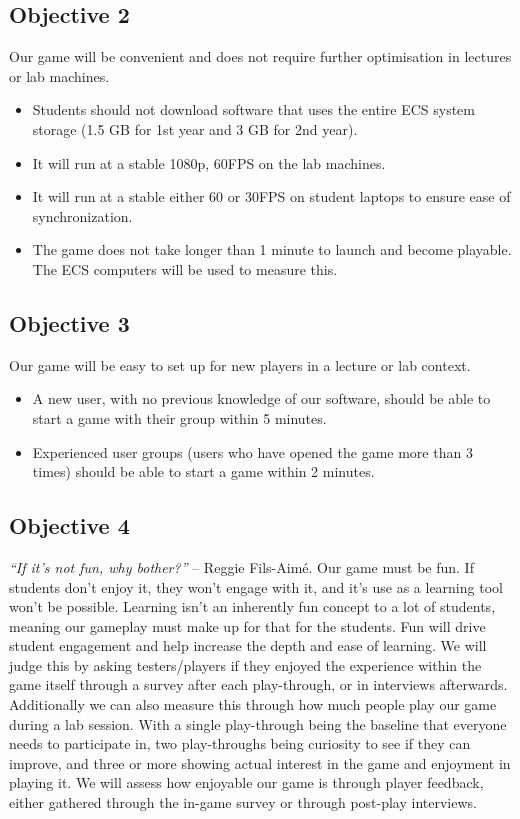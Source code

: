 \documentclass{article}
\begin{document}
\subsection*{Objective 2}
Our game will be convenient and does not require further optimisation in lectures or lab machines.
\begin{itemize}
    \item Students should not download software that uses the entire ECS system storage (1.5 GB for 1st year and 3 GB for 2nd year).
    \item It will run at a stable 1080p, 60FPS on the lab machines.
    \item It will run at a stable either 60 or 30FPS on student laptops to ensure ease of synchronization.
    \item The game does not take longer than 1 minute to launch and become playable. The ECS computers will be used to measure this.
\end{itemize}


\subsection*{Objective 3}
Our game will be easy to set up for new players in a lecture or lab context.
\begin{itemize}
    \item A new user, with no previous knowledge of our software, should be able to start a game with their group within 5 minutes.
    \item Experienced user groups (users who have opened the game more than 3 times) should be able to start a game within 2 minutes.
\end{itemize}

\subsection*{Objective 4}
\textit{“If it’s not fun, why bother?”} – Reggie Fils-Aimé.
\newline
Our game must be fun. If students don’t enjoy it, they won’t engage with it, and it's use as a learning tool won't be possible. Learning isn't an inherently fun concept to a lot of students, meaning our gameplay must make up for that for the students. Fun will drive student engagement and help increase the depth and ease of learning. 
\newline\newline
We will judge this by asking testers/players if they enjoyed the experience within the game itself through a survey after each play-through, or in interviews afterwards. Additionally we can also measure this through how much people play our game during a lab session. With a single play-through being the baseline that everyone needs to participate in, two play-throughs being curiosity to see if they can improve, and three or more showing actual interest in the game and enjoyment in playing it. We will assess how enjoyable our game is through player feedback, either gathered through the in-game survey or through post-play interviews.
\end{document}
